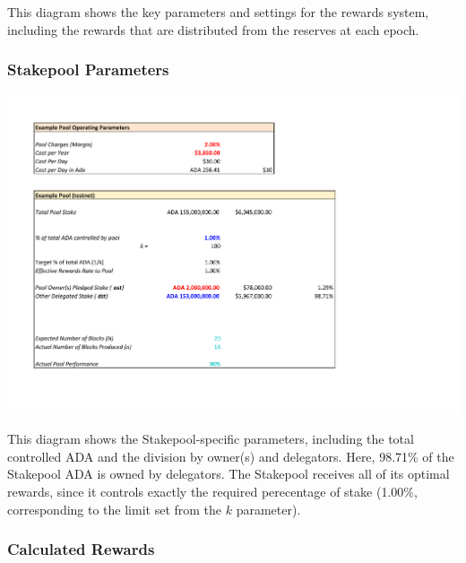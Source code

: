 \documentclass[11pt,a4paper,dvipsnames,twosided,final]{article}
\newcommand{\ada}{ADA{}}
\begin{document}
\begin{minipage}{\textwidth}
\noindent
This diagram shows the key parameters and settings for the rewards system, including the
rewards that are distributed from the reserves at each epoch.
\end{minipage}

\clearpage
\subsubsection*{Stakepool Parameters}
\includegraphics[width=1.2\textwidth]{RCT3.pdf}
\vspace{-0.5in}

\noindent
This diagram shows the Stakepool-specific parameters, including the total controlled \ada{} and the
division by owner(s) and delegators.  Here, 98.71\% of the Stakepool \ada{} is owned
by delegators.  The Stakepool receives all of its optimal rewards, since it controls
exactly the required perecentage of stake (1.00\%, corresponding to the limit set from
the $k$ parameter).

\clearpage
\subsubsection*{Calculated Rewards}
\end{document}
